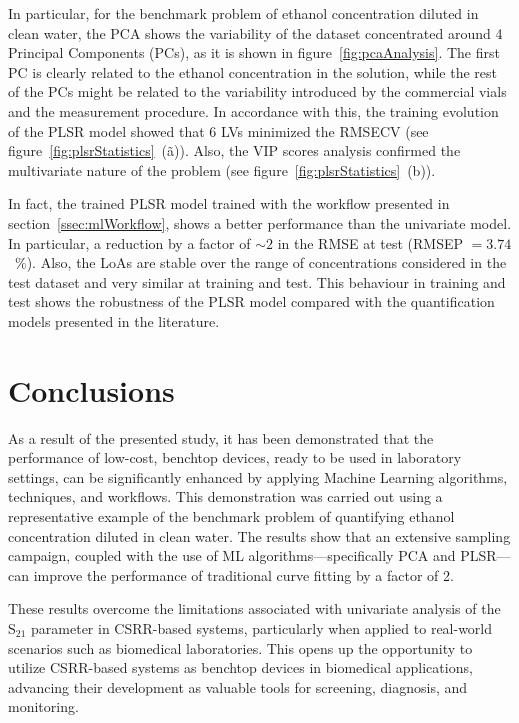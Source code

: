 \documentclass[journal,twoside,web]{ieeecolor}
\begin{document}
In particular, for the benchmark problem of ethanol concentration diluted in clean water, the PCA shows the variability of the dataset concentrated around 4 Principal Components (PCs), as it is shown in figure~\ref{fig:pcaAnalysis}. The first PC is clearly related to the ethanol concentration in the solution, while the rest of the PCs might be related to the variability introduced by the commercial vials and the measurement procedure. In accordance with this, the training evolution of the PLSR model showed that 6 LVs minimized the RMSECV (see figure~\ref{fig:plsrStatistics}~(ã)). Also, the VIP scores analysis confirmed the multivariate nature of the problem (see figure~\ref{fig:plsrStatistics}~(b)).
 
In fact, the trained PLSR model trained with the workflow presented in section~\ref{ssec:mlWorkflow}, shows a better performance than the univariate model. In particular, a reduction by a factor of $\sim2$ in the RMSE at test (RMSEP $=3.74$~$\%$). Also, the LoAs are stable over the range of concentrations considered in the test dataset and very similar at training and test. This behaviour in training and test shows the robustness of the PLSR model compared with the quantification models presented in the literature. 

\section{Conclusions}
\label{sec:conclusion}
As a result of the presented study, it has been demonstrated that the performance of low-cost, benchtop devices, ready to be used in laboratory settings, can be significantly enhanced by applying Machine Learning algorithms, techniques, and workflows. This demonstration was carried out using a representative example of the benchmark problem of quantifying ethanol concentration diluted in clean water. The results show that an extensive sampling campaign, coupled with the use of ML algorithms—specifically PCA and PLSR—can improve the performance of traditional curve fitting by a factor of 2.

These results overcome the limitations associated with univariate analysis of the S$_{21}$ parameter in CSRR-based systems, particularly when applied to real-world scenarios such as biomedical laboratories. This opens up the opportunity to utilize CSRR-based systems as benchtop devices in biomedical applications, advancing their development as valuable tools for screening, diagnosis, and monitoring.
\end{document}
